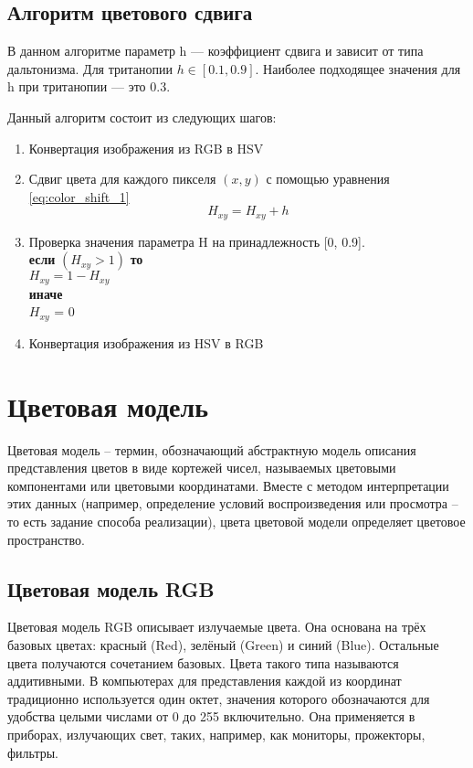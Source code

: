 \documentclass[a4paper,14pt, unknownkeysallowed]{extreport}
\begin{document}
    \subsection{Алгоритм цветового сдвига}

    В данном алгоритме параметр h --- коэффициент сдвига и зависит от типа дальтонизма. Для тританопии $h \in [0.1, 0.9]$. Наиболее подходящее значения для h при тританопии --- это 0.3.

    Данный алгоритм состоит из следующих шагов:
    \begin{enumerate}
        \item Конвертация изображения из RGB в HSV
        \item Сдвиг цвета для каждого пикселя $(x, y)$ с помощью уравнения \ref{eq:color_shift_1}
            \begin{equation}
            \label{eq:color_shift_1}
                H_{xy} = H_{xy} + h
            \end{equation}
        \item Проверка значения параметра H на принадлежность [0, 0.9]. \\
            \textbf{если} $(H_{xy} > 1)$ \textbf{то} \\
            $H_{xy} = 1 - H_{xy}$ \\
            \textbf{иначе} \\
            $H_{xy}$ = 0
        \item Конвертация изображения из HSV в RGB
    \end{enumerate}
 
    \section{Цветовая модель}
    Цветовая модель – термин, обозначающий абстрактную модель описания представления цветов в виде кортежей чисел, называемых цветовыми компонентами или цветовыми координатами. Вместе с методом интерпретации этих данных (например, определение условий воспроизведения или просмотра – то есть задание способа реализации), цвета цветовой модели определяет цветовое пространство.

    \subsection{Цветовая модель RGB}

    Цветовая модель RGB описывает излучаемые цвета. Она основана на трёх базовых цветах: красный (Red), зелёный (Green) и синий (Blue). Остальные цвета получаются сочетанием базовых. Цвета такого типа называются аддитивными. В компьютерах для представления каждой из координат традиционно используется один октет, значения которого обозначаются для удобства целыми числами от 0 до 255 включительно. Она применяется в приборах, излучающих свет, таких, например, как мониторы, прожекторы, фильтры.
\end{document}
